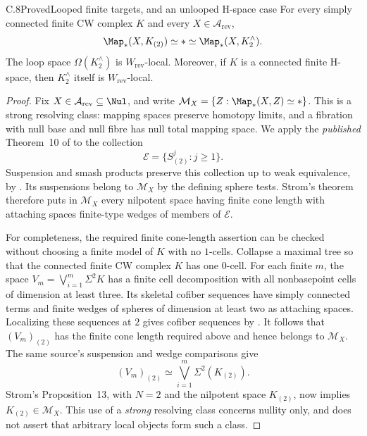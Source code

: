 \begin{claim}{C.8}{Proved}{Looped finite targets, and an unlooped H-space case}
For every simply connected finite CW complex $K$ and every $X\in\mathcal A_{\mathrm{rev}}$,
\[
 \Map_*(X,K_{(2)})\simeq *\simeq\Map_*(X,K^{\wedge}_2).
\]
The loop space $\Omega(K^{\wedge}_2)$ is $W_{\mathrm{rev}}$-local. Moreover, if $K$ is a connected finite H-space, then $K^{\wedge}_2$ itself is $W_{\mathrm{rev}}$-local.
\end{claim}
\begin{proof}
Fix $X\in\mathcal A_{\mathrm{rev}}\subseteq\Nul$, and write
$\mathcal M_X=\{Z:\Map_*(X,Z)\simeq *\}$. This is a strong resolving class: mapping spaces preserve homotopy limits, and a fibration with null base and null fibre has null total mapping space. We apply the \emph{published} Theorem~10 of \citet{Strom2003} to the collection
\[
 \mathcal E=\{S^j_{(2)}:j\geq1\}.
\]
Suspension and smash products preserve this collection up to weak equivalence, by \cite[Propositions 6.4.2 and 6.4.6]{FGHMayPonto2012}. Its suspensions belong to $\mathcal M_X$ by the defining sphere tests. Strom's theorem therefore puts in $\mathcal M_X$ every nilpotent space having finite cone length with attaching spaces finite-type wedges of members of $\mathcal E$.

For completeness, the required finite cone-length assertion can be checked without choosing a finite model of $K$ with no $1$-cells. Collapse a maximal tree so that the connected finite CW complex $K$ has one $0$-cell. For each finite $m$, the space $V_m=\bigvee_{i=1}^m\Sigma^2K$ has a finite cell decomposition with all nonbasepoint cells of dimension at least three. Its skeletal cofiber sequences have simply connected terms and finite wedges of spheres of dimension at least two as attaching spaces. Localizing these sequences at $2$ gives cofiber sequences by \cite[Propositions 6.4.1 and 6.4.4]{FGHMayPonto2012}. It follows that $(V_m)_{(2)}$ has the finite cone length required above and hence belongs to $\mathcal M_X$. The same source's suspension and wedge comparisons give
\[
 (V_m)_{(2)}\simeq\bigvee_{i=1}^m\Sigma^2(K_{(2)}).
\]
Strom's Proposition~13, with $N=2$ and the nilpotent space $K_{(2)}$, now implies $K_{(2)}\in\mathcal M_X$. This use of a \emph{strong} resolving class concerns nullity only, and does not assert that arbitrary local objects form such a class.


\end{proof}
